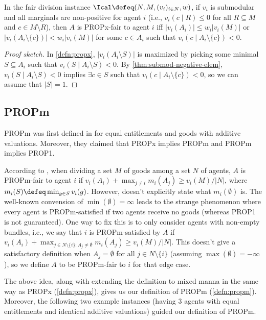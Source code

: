 \begin{lemma}
\label{thm:propx-equiv-submod-chores}
In the fair division instance $\Ical \defeq (N, M, (v_i)_{i \in N}, w)$,
if $v_i$ is submodular and all marginals are non-positive for agent $i$
(i.e., $v_i(c \mid R) \le 0$ for all $R \subseteq M$ and $c \in M \setminus R$),
then $A$ is PROPx-fair to agent $i$ iff $|v_i(A_i)| \le w_i|v_i(M)|$ or
$|v_i(A_i \setminus \{c\})| < w_i|v_i(M)|$ for some $c \in A_i$
such that $v_i(c \mid A_i \setminus \{c\}) < 0$.
\end{lemma}
\begin{proof}[Proof sketch]
In \cref{defn:propx}, $|v_i(A_i \setminus S)|$ is maximized by picking
some minimal $S \subseteq A_i$ such that $v_i(S \mid A_i \setminus S) < 0$.
By \cref{thm:submod-negative-elem}, $v_i(S \mid A_i \setminus S) < 0$ implies $\exists c \in S$
such that $v_i(c \mid A_i \setminus \{c\}) < 0$, so we can assume \wLoG{} that $|S| = 1$.
\end{proof}

\subsection{PROPm}
\label{sec:notions:propm}

PROPm was first defined in \cite{baklanov2021achieving}
for equal entitlements and goods with additive valuations.
Moreover, they claimed that PROPx implies PROPm and PROPm implies PROP1.

According to \cite{baklanov2021achieving}, when dividing a set $M$ of goods among a set $N$ of agents,
$A$ is PROPm-fair to agent $i$ if $v_i(A_i) + \max_{j \neq i} m_i(A_j) \ge v_i(M)/|N|$,
where $m_i(S) \defeq \min_{g \in S} v_i(g)$.
However, \cite{baklanov2021achieving} doesn't explicitly state what $m_i(\emptyset)$ is.
The well-known convension of $\min(\emptyset) = \infty$ leads to the strange phenomenon
where every agent is PROPm-satisfied if two agents receive no goods
(whereas PROP1 is not guaranteed).
One way to fix this is to only consider agents with non-empty bundles,
i.e., we say that $i$ is PROPm-satisfied by $A$ if
$v_i(A_i) + \max_{j \in N \setminus \{i\}: A_j \neq \emptyset} m_i(A_j) \ge v_i(M)/|N|$.
This doesn't give a satisfactory definition when $A_j = \emptyset$
for all $j \in N \setminus \{i\}$ (assuming $\max(\emptyset) = -\infty$),
so we define $A$ to be PROPm-fair to $i$ for that edge case.

The above idea, along with extending the definition to mixed manna
in the same way as PROPx (\cref{defn:propx}),
gives us our definition of PROPm (\cref{defn:propm}).
Moreover, the following two example instances
(having 3 agents with equal entitlements and identical additive valuations)
guided our definition of PROPm.

